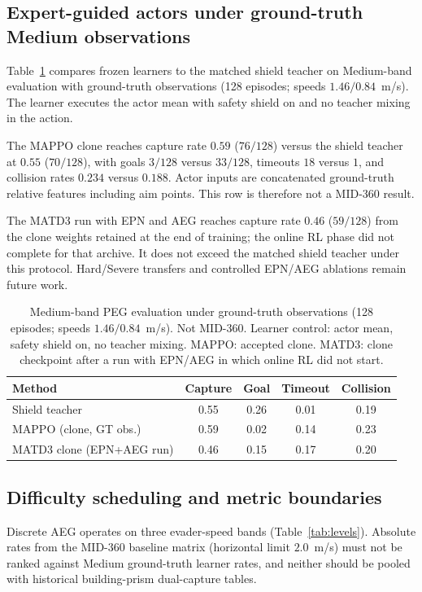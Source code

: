 \documentclass{SCIS2026}
\begin{document}
\subsection{Expert-guided actors under ground-truth Medium observations}
Table~\ref{tab:peg-learner} compares frozen learners to the matched shield teacher on Medium-band evaluation with ground-truth observations (128 episodes; speeds $1.46/0.84$~m/s). The learner executes the actor mean with safety shield on and no teacher mixing in the action.

The MAPPO clone reaches capture rate $0.59$ ($76/128$) versus the shield teacher at $0.55$ ($70/128$), with goals $3/128$ versus $33/128$, timeouts $18$ versus $1$, and collision rates $0.234$ versus $0.188$. Actor inputs are concatenated ground-truth relative features including aim points. This row is therefore not a MID-360 result.

The MATD3 run with EPN and AEG reaches capture rate $0.46$ ($59/128$) from the clone weights retained at the end of training; the online RL phase did not complete for that archive. It does not exceed the matched shield teacher under this protocol. Hard/Severe transfers and controlled EPN/AEG ablations remain future work.

\begin{table}[H]
\footnotesize
\caption{Medium-band PEG evaluation under ground-truth observations (128 episodes; speeds $1.46/0.84$~m/s). Not MID-360. Learner control: actor mean, safety shield on, no teacher mixing. MAPPO: accepted clone. MATD3: clone checkpoint after a run with EPN/AEG in which online RL did not start.}
\label{tab:peg-learner}
\begin{tabularx}{\textwidth}{Xcccc}
\toprule
Method & Capture & Goal & Timeout & Collision \\\hline
Shield teacher & 0.55 & 0.26 & 0.01 & 0.19 \\
MAPPO (clone, GT obs.) & 0.59 & 0.02 & 0.14 & 0.23 \\
MATD3 clone (EPN+AEG run) & 0.46 & 0.15 & 0.17 & 0.20 \\
\bottomrule
\end{tabularx}
\end{table}

\subsection{Difficulty scheduling and metric boundaries}
Discrete AEG operates on three evader-speed bands (Table~\ref{tab:levels}). Absolute rates from the MID-360 baseline matrix (horizontal limit $2.0$~m/s) must not be ranked against Medium ground-truth learner rates, and neither should be pooled with historical building-prism dual-capture tables.
\end{document}
